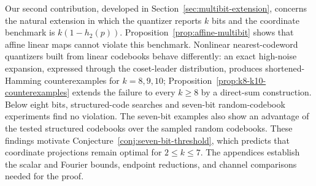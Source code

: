 Our second contribution, developed in
Section~\ref{sec:multibit-extension}, concerns the natural extension in
which the quantizer reports \(k\) bits and the coordinate benchmark is
\(k(1-h_2(p))\). Proposition~\ref{prop:affine-multibit} shows that affine
linear maps cannot violate this benchmark. Nonlinear nearest-codeword
quantizers built from linear codebooks behave differently: an exact
high-noise expansion, expressed through the coset-leader distribution,
produces shortened-Hamming counterexamples for \(k=8,9,10\); Proposition~\ref{prop:k8-k10-counterexamples}
extends the failure to every \(k\geq8\) by a direct-sum construction. Below eight bits, structured-code searches and seven-bit random-codebook
experiments find no violation. The seven-bit examples also show an
advantage of the tested structured codebooks over the sampled random
codebooks. These findings motivate
Conjecture~\ref{conj:seven-bit-threshold}, which predicts that coordinate
projections remain optimal for \(2\leq k\leq7\). The appendices establish
the scalar and Fourier bounds, endpoint reductions, and channel
comparisons needed for the proof.
